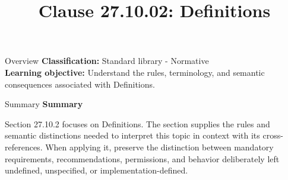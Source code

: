 \documentclass[10pt,letterpaper]{article}
\title{Clause 27.10.02: Definitions}
\author{}
\date{}
\begin{document}
\maketitle
\begin{CornellOverviewBox}{Overview}
\textbf{Classification:} Standard library - Normative\\[2pt]
\textbf{Learning objective:} Understand the rules, terminology, and semantic consequences associated with Definitions.
\end{CornellOverviewBox}\begin{CornellSummaryBox}{Summary}
{\sffamily\bfseries\color{Accent} Summary}\par\vspace{3pt}Section 27.10.2 focuses on Definitions. The section supplies the rules and semantic distinctions needed to interpret this topic in context with its cross-references. When applying it, preserve the distinction between mandatory requirements, recommendations, permissions, and behavior deliberately left undefined, unspecified, or implementation-defined.
\end{CornellSummaryBox}
\end{document}
